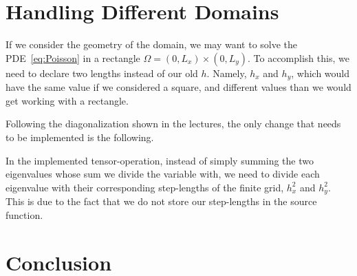 \documentclass[fontsize=11pt,paper=a4,titlepage]{article}
\begin{document}
\section{Handling Different Domains}

If we consider the geometry of the domain, we may want to solve the
PDE~\ref{eq:Poisson} in a rectangle $\Omega = (0, L_x) \times (0, L_y)$. To
accomplish this, we need to declare two lengths instead of our old $h$. Namely,
$h_x$ and $h_y$, which would have the same value if we considered a square, and
different values than we would get working with a rectangle.

Following the diagonalization shown in the lectures, the only change that needs
to be implemented is the following.

In the implemented tensor-operation, instead of simply summing the two
eigenvalues whose sum we divide the variable with, we need to divide each
eigenvalue with their corresponding step-lengths of the finite grid, $h_x^2$ and
$h_y^2$. This is due to the fact that we do not store our step-lengths in the
source function.

\section{Conclusion}


{}

\end{document}
